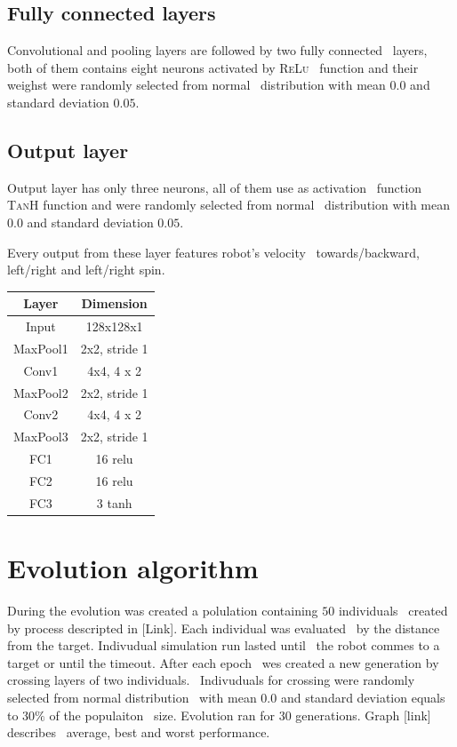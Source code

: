 \documentclass[twocolumn,10pt]{asme2ej}
\begin{document}
\subsection{Fully connected layers}
Convolutional and pooling layers are followed by two fully connected \
layers, both of them contains eight neurons activated by \textsc{ReLu} \
function and their weighst were randomly selected from normal \
distribution with mean $0.0$ and standard deviation $0.05$.\

\subsection{Output layer}
Output layer has only three neurons, all of them use as activation \
function \textsc{TanH} function and were randomly selected from normal \
distribution with mean $0.0$ and standard deviation $0.05$.\
\par Every output from these layer features robot's velocity \
towards/backward, left/right and left/right spin.

\begin{center}
    \begin{tabular}{ |c|c| } 
     \hline
     Layer & Dimension \\ 
     \hline
     \hline  
     Input & 128x128x1 \\ 
     \hline
     MaxPool1 & 2x2, stride 1 \\ 
     \hline
     Conv1 & 4x4, 4 x 2 \\
     \hline
     MaxPool2 & 2x2, stride 1 \\ 
     \hline
     Conv2 & 4x4, 4 x 2 \\ 
     \hline
     MaxPool3 & 2x2, stride 1 \\
     \hline
     FC1 & 16 relu \\
     \hline
     FC2 & 16 relu \\
     \hline
     FC3 & 3 tanh \\
     \hline
    \end{tabular}
    \end{center}

\section{Evolution algorithm}
During the evolution was created a polulation containing $50$ individuals \
created by process descripted in [Link]. Each individual was evaluated \
by the distance from the target. Indivudual simulation run lasted until \
the robot commes to a target or until the timeout. After each epoch \
wes created a new generation by crossing layers of two individuals. \
Indivuduals for crossing were randomly selected from normal distribution \
with mean $0.0$ and standard deviation equals to $30\%$ of the populaiton \
size. Evolution ran for $30$ generations. Graph [link] describes \
average, best and worst performance.
\end{document}
